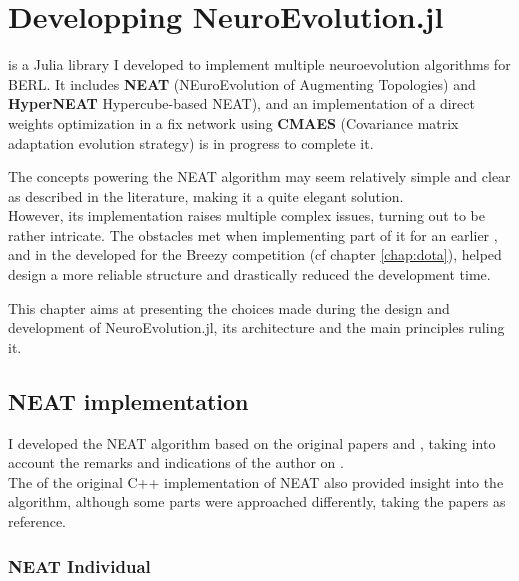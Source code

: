 \chapter{Developping NeuroEvolution.jl}
\label{chap:neuroevo}

 is a Julia library I developed to implement multiple neuroevolution algorithms for BERL. It includes \textbf{NEAT} (NEuroEvolution of Augmenting Topologies) and \textbf{HyperNEAT} Hypercube-based NEAT), and an implementation of a direct weights optimization in a fix network using \textbf{CMAES} (Covariance matrix adaptation evolution strategy) is in progress to complete it. 

The concepts powering the NEAT algorithm may seem relatively simple and clear as described in the literature, making it a quite elegant solution. \\
However, its implementation raises multiple complex issues, turning out to be rather intricate. The obstacles met when implementing part of it for an earlier ,  and in the  developed for the Breezy competition (cf chapter \ref{chap:dota}), helped design a more reliable structure and drastically reduced the development time.

This chapter aims at presenting the choices made during the design and development of NeuroEvolution.jl, its architecture and the main principles ruling it. 

\section{NEAT implementation}
I developed the NEAT algorithm based on the original papers \cite{NEAT_1} and \cite{NEAT_2}, taking into account the remarks and indications of the author on . \\
The  of the original C++ implementation of NEAT also provided insight into the algorithm, although some parts were approached differently, taking the papers as reference.

\subsection{NEAT Individual}

